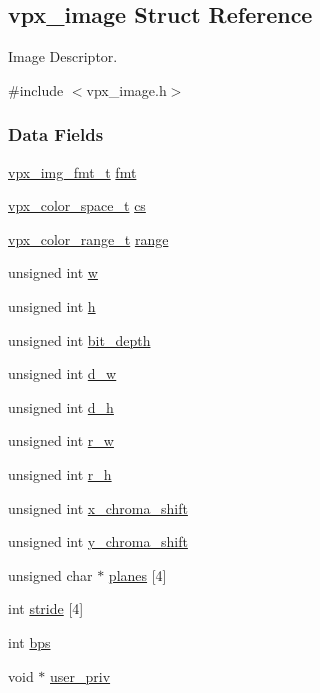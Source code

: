 \hypertarget{structvpx__image}{}\subsection{vpx\+\_\+image Struct Reference}
\label{structvpx__image}


Image Descriptor.  




{\ttfamily \#include $<$vpx\+\_\+image.\+h$>$}

\subsubsection*{Data Fields}
\begin{DoxyCompactItemize}
\item 
\hyperlink{vpx__image_8h_ae694ce1faf676cdb73a8fd6702a67d9c}{vpx\+\_\+img\+\_\+fmt\+\_\+t} \hyperlink{structvpx__image_a1d734f8afa9200a21c2d9f6bcf8c04d8}{fmt}
\item 
\hyperlink{vpx__image_8h_a090b89b8b0cce8d8a4b08a09d81bb772}{vpx\+\_\+color\+\_\+space\+\_\+t} \hyperlink{structvpx__image_a8fda4fb8430e4cede2a4ee7d28dd0a6c}{cs}
\item 
\hyperlink{vpx__image_8h_a644bb65a7cc854238c73ee1e55c5c0ac}{vpx\+\_\+color\+\_\+range\+\_\+t} \hyperlink{structvpx__image_af451ddd9be4cf49958e253a2b8dd12a9}{range}
\item 
unsigned int \hyperlink{structvpx__image_ac7b7d569142f878155b28141653adcd6}{w}
\item 
unsigned int \hyperlink{structvpx__image_a9d1070804dfe08cd5becd68d597fee69}{h}
\item 
unsigned int \hyperlink{structvpx__image_aac11754e8f8e4fb9e7b3a721ce8be0f1}{bit\+\_\+depth}
\item 
unsigned int \hyperlink{structvpx__image_a806bf23143bf00a0b3fdbd6ba030c483}{d\+\_\+w}
\item 
unsigned int \hyperlink{structvpx__image_a31bc5f045d4f3c2b6bb0f57bb53078e7}{d\+\_\+h}
\item 
unsigned int \hyperlink{structvpx__image_a1fe4736c2554836d510589cdbbece76a}{r\+\_\+w}
\item 
unsigned int \hyperlink{structvpx__image_ad969a04e4a11749f3718ef5909db6da8}{r\+\_\+h}
\item 
unsigned int \hyperlink{structvpx__image_affaf210489dcefebd90b87fd5f12dc0b}{x\+\_\+chroma\+\_\+shift}
\item 
unsigned int \hyperlink{structvpx__image_a1e3d9b699d46ca32e3916d1ac635a4a2}{y\+\_\+chroma\+\_\+shift}
\item 
unsigned char $\ast$ \hyperlink{structvpx__image_ab6258308ba7a5f4a113348120e20e2ce}{planes} \mbox{[}4\mbox{]}
\item 
int \hyperlink{structvpx__image_ac9c7b83e3eea44cb680956f90dc789cf}{stride} \mbox{[}4\mbox{]}
\item 
int \hyperlink{structvpx__image_a53a02fad822151eb8eeb2f64f195e1f6}{bps}
\item 
void $\ast$ \hyperlink{structvpx__image_a28ae6c046dfca87de4fca4e67cab563d}{user\+\_\+priv}\hypertarget{structvpx__image_a28ae6c046dfca87de4fca4e67cab563d}{}\label{structvpx__image_a28ae6c046dfca87de4fca4e67cab563d}


\end{DoxyCompactItemize}
